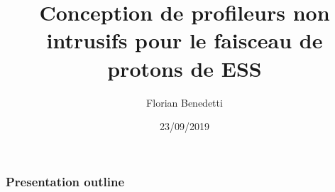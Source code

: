 \documentclass[handout,9pt]{beamer}
\title{Conception de profileurs non intrusifs pour le faisceau de protons de ESS}
\author{Florian Benedetti}
\institute{CEA/IRFU}
\date{23/09/2019}
\begin{document}
\frame{\titlepage}

\begin{frame}
  \frametitle{Presentation outline}
  \tableofcontents[hideothersubsections]{}
\end{frame}






\end{document}
